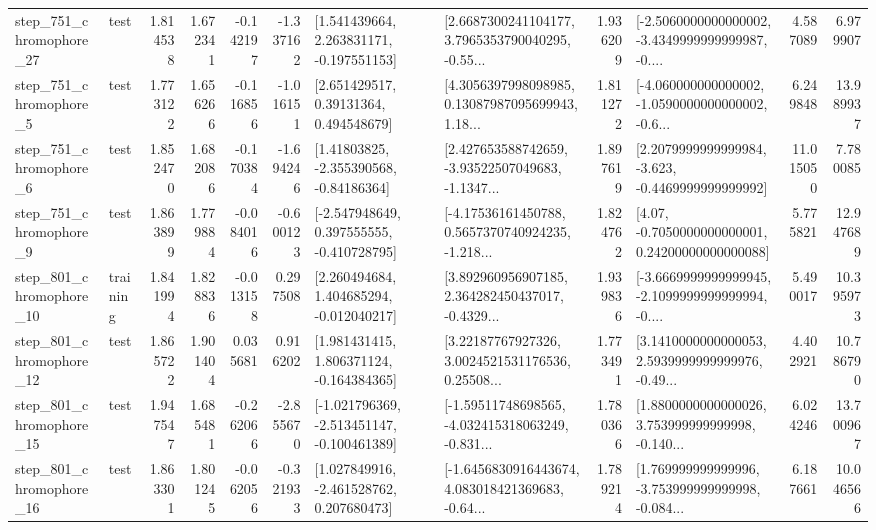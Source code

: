 \begin{tabular}{llrrrrllrlrr}
  step\_751\_chromophore\_27 &      test &      1.814538 &    1.672341 &     -0.142197 & -1.337162 &    [1.541439664, 2.263831171, -0.197551153] &  [2.6687300241104177, 3.7965353790040295, -0.55... &       1.936209 &  [-2.5060000000000002, -3.4349999999999987, -0.... &            4.587089 &          6.979907 \\
   step\_751\_chromophore\_5 &      test &      1.773122 &    1.656266 &     -0.116856 & -1.016151 &      [2.651429517, 0.39131364, 0.494548679] &  [4.3056397998098985, 0.13087987095699943, 1.18... &       1.811272 &  [-4.060000000000002, -1.0590000000000002, -0.6... &            6.249848 &         13.989937 \\
   step\_751\_chromophore\_6 &      test &      1.852470 &    1.682086 &     -0.170384 & -1.694246 &     [1.41803825, -2.355390568, -0.84186364] &  [2.427653588742659, -3.93522507049683, -1.1347... &       1.897619 &  [2.2079999999999984, -3.623, -0.4469999999999992] &           11.015050 &          7.780085 \\
   step\_751\_chromophore\_9 &      test &      1.863899 &    1.779884 &     -0.084016 & -0.600123 &   [-2.547948649, 0.397555555, -0.410728795] &  [-4.17536161450788, 0.5657370740924235, -1.218... &       1.824762 &   [4.07, -0.7050000000000001, 0.24200000000000088] &            5.775821 &         12.947689 \\
  step\_801\_chromophore\_10 &  training &      1.841994 &    1.828836 &     -0.013158 &  0.297508 &    [2.260494684, 1.404685294, -0.012040217] &  [3.892960956907185, 2.364282450437017, -0.4329... &       1.939836 &  [-3.6669999999999945, -2.1099999999999994, -0.... &            5.490017 &         10.395973 \\
  step\_801\_chromophore\_12 &      test &      1.865722 &    1.901404 &      0.035681 &  0.916202 &    [1.981431415, 1.806371124, -0.164384365] &  [3.22187767927326, 3.0024521531176536, 0.25508... &       1.773491 &  [3.1410000000000053, 2.5939999999999976, -0.49... &            4.402921 &         10.786790 \\
  step\_801\_chromophore\_15 &      test &      1.947547 &    1.685481 &     -0.262066 & -2.855670 &  [-1.021796369, -2.513451147, -0.100461389] &  [-1.59511748698565, -4.032415318063249, -0.831... &       1.780366 &  [1.8800000000000026, 3.753999999999998, -0.140... &            6.024246 &         13.700967 \\
  step\_801\_chromophore\_16 &      test &      1.863301 &    1.801245 &     -0.062056 & -0.321933 &    [1.027849916, -2.461528762, 0.207680473] &  [-1.6456830916443674, 4.083018421369683, -0.64... &       1.789214 &  [1.769999999999996, -3.753999999999998, -0.084... &            6.187661 &         10.046566 \\

\end{tabular}
